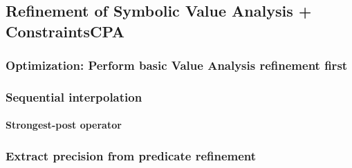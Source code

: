 \subsection{Refinement of Symbolic Value Analysis + ConstraintsCPA}
\subsubsection{Optimization: Perform basic Value Analysis refinement first}
\subsubsection{Sequential interpolation}
\paragraph{Strongest-post operator}
\subsubsection{Extract precision from predicate refinement}
